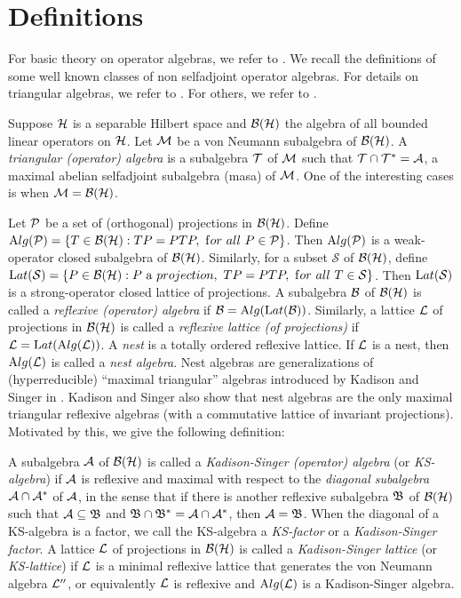 \section{ Definitions}

\noindent For basic theory on operator algebras, we refer to \cite{KR}.
We recall the definitions of some well known classes of non
selfadjoint operator algebras. For details on triangular algebras,
we refer to \cite{KS}. For others, we refer to \cite{RR}.

Suppose $\mathcal H$ is a separable Hilbert space and $\mathcal B(\mathcal H)$ the algebra
of all bounded linear operators on $\mathcal H$.  Let $\mathcal M$ be a von
Neumann subalgebra of $\mathcal B(\mathcal H)$. A {\it triangular (operator)
algebra} is a subalgebra $\mathcal T$ of $\mathcal M$ such that $ \mathcal T \cap \mathcal T^*
= \mathcal A$, a maximal abelian selfadjoint subalgebra (masa) of $\mathcal M$.
One of the interesting cases is when  $\mathcal M=\mathcal B(\mathcal H)$.

Let $\mathcal P$ be a set of (orthogonal) projections in $\mathcal B(\mathcal H)$. Define
$\mathrm Alg(\mathcal P)=\{ T \in\mathcal B(\mathcal H): TP=PTP, \ {\mathrm for\ all}\ P\in\mathcal P\}$.
Then $\mathrm Alg(\mathcal P)$ is a weak-operator closed subalgebra of $\mathcal B(\mathcal H)$.
Similarly, for a subset $\mathcal S$ of $\mathcal B(\mathcal H)$, define $\mathrm Lat (\mathcal
S)=\{P\in\mathcal B(\mathcal H): P\ {\mathrm a \ projection},\ TP=PTP, \ {\mathrm for\
all}\ T\in\mathcal S\}$. Then $\mathrm Lat(\mathcal S)$ is a strong-operator closed
lattice of projections. A subalgebra $\mathcal B$ of $\mathcal B(\mathcal H)$ is called a
{\it reflexive (operator) algebra} if $\mathcal B=\mathrm Alg(\mathrm Lat (\mathcal B))$.
Similarly, a lattice $\mathcal L$ of projections in $\mathcal B(\mathcal H)$ is called a
{\it reflexive lattice (of projections)} if $\mathcal L=\mathrm Lat(\mathrm Alg(\mathcal L))$. A
{\it nest} is a totally ordered reflexive lattice. If $\mathcal L$ is a
nest, then $\mathrm Alg(\mathcal L)$ is called a {\it nest algebra}. Nest
algebras are generalizations of (hyperreducible) ``maximal
triangular'' algebras introduced by Kadison and Singer in \cite{KS}.
Kadison and Singer also show that nest algebras are the only
maximal triangular reflexive algebras (with a commutative lattice
of invariant projections). Motivated by this, we give the
following definition:

\vskip6pt

\begin{definition}
A subalgebra $\mathcal A$ of $\mathcal B(\mathcal H)$
is called a {\sl Kadison-Singer (operator) algebra} (or {\it
KS-algebra}) if $\mathcal A$ is reflexive and maximal with respect to the
{\it diagonal subalgebra} $\mathcal A\cap \mathcal A^*$ of $\mathcal A$, in the sense that
if there is another reflexive subalgebra $\frak B$ of $\mathcal B(\mathcal H)$
such that $\mathcal A\subseteq\frak B$ and $\frak B\cap\frak B^*=\mathcal A\cap
\mathcal A^*$, then $\mathcal A=\frak B$. When the diagonal of a KS-algebra is a
factor, we call the KS-algebra a {\it KS-factor} or a {\it
Kadison-Singer factor}. A lattice $\mathcal L$ of projections in $\mathcal B(\mathcal H)$
is called a {\it Kadison-Singer lattice} (or {\sl KS-lattice}) if
$\mathcal L$ is a minimal reflexive lattice that generates the von Neumann
algebra $\mathcal L''$, or equivalently $\mathcal L$ is reflexive and $\mathrm Alg(\mathcal L)$
is a Kadison-Singer algebra.
\end{definition}

